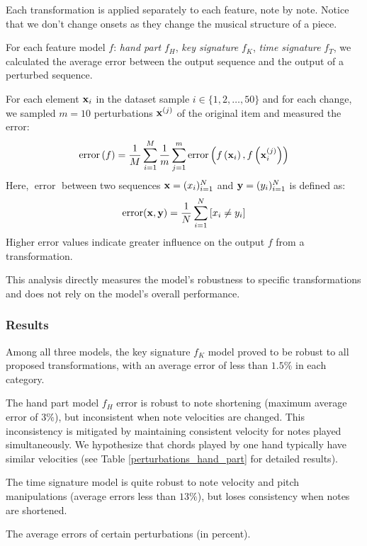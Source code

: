 Each transformation is applied separately to each feature, note by note. Notice that we don't change onsets as they change the musical structure of a piece.

For each feature model $f$: \emph{hand part} $f_H$, \emph{key signature} $f_K$, \emph{time signature} $f_T$, we calculated the average error between the output sequence and the output of a perturbed sequence.

For each element ${\bf x}_i$ in the dataset sample $i\in\{1,2,\ldots,50\}$ and for each change, we sampled $m=10$ perturbations ${\bf x}^{(j)}$ of the original item and measured the error: $$\operatorname{error}\left(f\right) = \frac{1}{M}\sum_{i=1}^{M}\frac{1}{m}\sum_{j=1}^{m}\operatorname{error}\left(f\left({\bf x}_i\right), f\left({\bf x}_i^{(j)}\right)\right)$$ Here, $\operatorname{error}$ between two sequences ${\bf x} = (x_i)_{i=1}^N$ and ${\bf y} = (y_i)_{i=1}^N$ is defined as: $$\operatorname{error}({\bf x},{\bf y}) = \frac{1}{N}\sum_{i=1}^N \left[x_i \neq y_i\right]$$ Higher error values indicate greater influence on the output $f$ from a transformation.

This analysis directly measures the model's robustness to specific transformations and does not rely on the model's overall performance.

\subsubsection{Results}

Among all three models, the key signature $f_K$ model proved to be robust to all proposed transformations, with an average error of less than $1.5\%$ in each category.

The hand part model $f_H$ error is robust to note shortening (maximum average error of $3\%$), but inconsistent when note velocities are changed. This inconsistency is mitigated by maintaining consistent velocity for notes played simultaneously. We hypothesize that chords played by one hand typically have similar velocities (see Table \ref{perturbations_hand_part} for detailed results).

The time signature model is quite robust to note velocity and pitch manipulations (average errors less than $13\%$), but loses consistency when notes are shortened. \begin{table}[ht!]

\caption{The average errors of certain perturbations (in percent).}
\label{perturbations}
\end{table}

